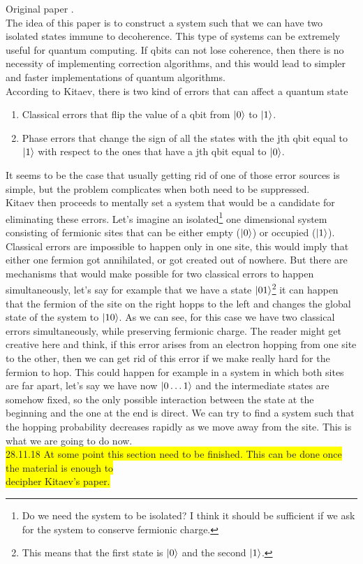 Original paper \cite{2001kitaev}.\\

The idea of this paper is to construct a system such that we can have two isolated states immune to decoherence. This type of systems can be extremely useful for quantum computing. If qbits can not lose coherence, then there is no necessity of implementing correction algorithms, and this would lead to simpler and faster implementations of quantum algorithms.\\

According to Kitaev, there is two kind of errors that can affect a quantum state

\begin{enumerate}
    \item Classical errors that flip the value of a qbit from $\ket{0}$ to $\ket{1}$.
    \item Phase errors that change the sign of all the states with the jth qbit equal to $\ket{1}$ with respect to the ones that have a jth qbit equal to $\ket{0}$.
\end{enumerate}

It seems to be the case that usually getting rid of one of those error sources is simple, but the problem complicates when both need to be suppressed.\\

Kitaev then proceeds to mentally set a system that would be a candidate for eliminating these errors. Let's imagine an isolated\footnote{Do we need the system to be isolated? I think it should be sufficient if we ask for the system to conserve fermionic charge.} one dimensional system consisting of fermionic sites that can be either empty ($\ket{0}$) or occupied ($\ket{1}$). Classical errors are impossible to happen only in one site, this would imply that either one fermion got annihilated, or got created out of nowhere. But there are mechanisms that would make possible for two classical errors to happen simultaneously, let's say for example that we have a state $\ket{01}$\footnote{This means that the first state is $\ket{0}$ and the second $\ket{1}$.} it can happen that the fermion of the site on the right hopps to the left and changes the global state of the system to $\ket{10}$. As we can see, for this case we have two classical errors simultaneously, while preserving fermionic charge. The reader might get creative here and think, if this error arises from an electron hopping from one site to the other, then we can get rid of this error if we make really hard for the fermion to hop. This could happen for example in a system in which both sites are far apart, let's say we have now $\ket{0\ldots1}$ and the intermediate states are somehow fixed, so the only possible interaction between the state at the beginning and the one at the end is direct. We can try to find a system such that the hopping probability decreases rapidly as we move away from the site. This is what we are going to do now.\\

\colorbox{yellow}{28.11.18 At some point this section need to be finished. This can be done once the material is enough to }\\
\colorbox{yellow}{decipher Kitaev's paper.}
